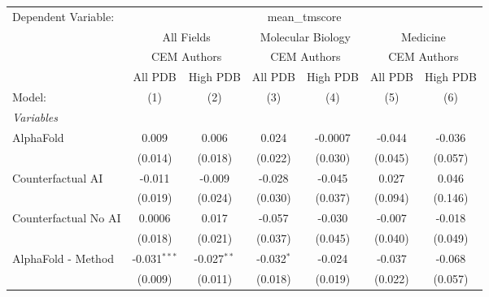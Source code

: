 \begingroup
\centering
\begin{tabular}{lcccccc}
   \tabularnewline \midrule \midrule
   Dependent Variable: & \multicolumn{6}{c}{mean\_tmscore}\\
 & \multicolumn{2}{c}{All Fields} & \multicolumn{2}{c}{Molecular Biology} & \multicolumn{2}{c}{Medicine} \\
\cmidrule(lr){2-3} \cmidrule(lr){4-5} \cmidrule(lr){6-7}
 & \multicolumn{2}{c}{CEM Authors} & \multicolumn{2}{c}{CEM Authors} & \multicolumn{2}{c}{CEM Authors} \\
\cmidrule(lr){2-3} \cmidrule(lr){4-5} \cmidrule(lr){6-7}
 & \multicolumn{1}{c}{All PDB} & \multicolumn{1}{c}{High PDB} & \multicolumn{1}{c}{All PDB} & \multicolumn{1}{c}{High PDB} & \multicolumn{1}{c}{All PDB} & \multicolumn{1}{c}{High PDB} \\
\cmidrule(lr){2-2} \cmidrule(lr){3-3} \cmidrule(lr){4-4} \cmidrule(lr){5-5} \cmidrule(lr){6-6} \cmidrule(lr){7-7}
   Model:                                                     & (1)            & (2)           & (3)          & (4)         & (5)          & (6)\\  
   \midrule
   \emph{Variables}\\
   AlphaFold                                                  & 0.009          & 0.006         & 0.024        & -0.0007     & -0.044       & -0.036\\   
                                                              & (0.014)        & (0.018)       & (0.022)      & (0.030)     & (0.045)      & (0.057)\\   
   Counterfactual AI                                          & -0.011         & -0.009        & -0.028       & -0.045      & 0.027        & 0.046\\   
                                                              & (0.019)        & (0.024)       & (0.030)      & (0.037)     & (0.094)      & (0.146)\\   
   Counterfactual No AI                                       & 0.0006         & 0.017         & -0.057       & -0.030      & -0.007       & -0.018\\   
                                                              & (0.018)        & (0.021)       & (0.037)      & (0.045)     & (0.040)      & (0.049)\\   
   AlphaFold - Method                                         & -0.031$^{***}$ & -0.027$^{**}$ & -0.032$^{*}$ & -0.024      & -0.037       & -0.068\\   
                                                              & (0.009)        & (0.011)       & (0.018)      & (0.019)     & (0.022)      & (0.057)\\   

\end{tabular}
